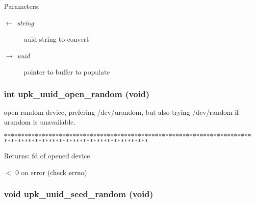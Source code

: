 \begin{Desc}
\item[Parameters:]
\begin{description}
\item[\mbox{$\leftarrow$} {\em string}]uuid string to convert\item[\mbox{$\rightarrow$} {\em uuid}]pointer to buffer to populate \end{description}
\end{Desc}
\subsubsection{\setlength{\rightskip}{0pt plus 5cm}int upk\_\-uuid\_\-open\_\-random (void)}\label{group__uuid__functions_gd11adf71a9fb86e0ee39898ad6c8421a}


open random device, prefering /dev/urandom, but also trying /dev/random if urandom is unavailable. 

$\ast$$\ast$$\ast$$\ast$$\ast$$\ast$$\ast$$\ast$$\ast$$\ast$$\ast$$\ast$$\ast$$\ast$$\ast$$\ast$$\ast$$\ast$$\ast$$\ast$$\ast$$\ast$$\ast$$\ast$$\ast$$\ast$$\ast$$\ast$$\ast$$\ast$$\ast$$\ast$$\ast$$\ast$$\ast$$\ast$$\ast$$\ast$$\ast$$\ast$$\ast$$\ast$$\ast$$\ast$$\ast$$\ast$$\ast$$\ast$$\ast$$\ast$$\ast$$\ast$$\ast$$\ast$$\ast$$\ast$$\ast$$\ast$$\ast$$\ast$$\ast$$\ast$$\ast$$\ast$$\ast$$\ast$$\ast$$\ast$$\ast$$\ast$$\ast$$\ast$$\ast$$\ast$$\ast$$\ast$$\ast$$\ast$$\ast$$\ast$$\ast$$\ast$$\ast$$\ast$$\ast$$\ast$$\ast$$\ast$$\ast$$\ast$$\ast$$\ast$$\ast$$\ast$$\ast$$\ast$$\ast$$\ast$$\ast$$\ast$$\ast$$\ast$$\ast$$\ast$$\ast$$\ast$$\ast$$\ast$$\ast$$\ast$$\ast$$\ast$$\ast$$\ast$

\begin{Desc}
\item[Returns:]fd of opened device

$<$ 0 on error (check errno) \end{Desc}
\subsubsection{\setlength{\rightskip}{0pt plus 5cm}void upk\_\-uuid\_\-seed\_\-random (void)}\label{group__uuid__functions_g6e152a2a0a733fca53b77cf5ab3c74c1}


